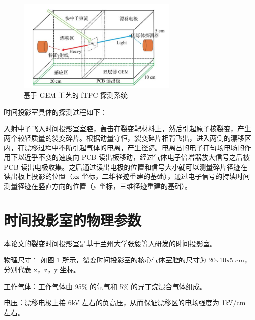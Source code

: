 \documentclass[AutoFakeBold]{LZUThesis}
\begin{document}
\begin{figure}[H]
    \centering
    \includegraphics[width=0.7\textwidth]{figures/GEM-TPC.png}
    \caption{基于 GEM 工艺的 fTPC 探测系统\cite{魏康2019基于GEM工艺的裂变时间投影室中裂变碎片的讨论}}
    \label{fig_GEM-TPC}
\end{figure}



时间投影室具体的探测过程如下：

入射中子飞入时间投影室室腔，轰击在裂变靶材料上，然后引起原子核裂变，产生两个较轻质量的裂变碎片。根据动量守恒，裂变碎片相背飞出，进入两侧的漂移区内，在漂移过程中不断引起气体的电离，产生径迹。电离出的电子在匀场电场的作用下以近乎不变的速度向 PCB 读出板移动，经过气体电子倍增器放大信号之后被 PCB 读出电极收集。之后通过读出电极的位置和信号大小就可以测量碎片径迹在读出板上投影的位置（xz 坐标，二维径迹重建的基础），通过电子信号的持续时间测量径迹在竖直方向的位置（y 坐标，三维径迹重建的基础）\cite{魏康2019基于GEM工艺的裂变时间投影室中裂变碎片的讨论}。





\section{时间投影室的物理参数}
本论文的裂变时间投影室是基于兰州大学张毅等人研发的时间投影室\cite{魏康2019基于GEM工艺的裂变时间投影室中裂变碎片的讨论}。

物理尺寸：
如图 \ref{fig_GEM-TPC} 所示，裂变时间投影室的核心气体室腔的尺寸为 20x10x5 cm，分别代表 x，z，y 坐标。

工作气体：工作气体由 95\% 的氩气和 5\% 的异丁烷混合气体组成\cite{魏康2019基于GEM工艺的裂变时间投影室中裂变碎片的讨论}。

电压：漂移电极上接 6kV 左右的负高压，从而保证漂移区的电场强度为 1kV/cm 左右。
\end{document}
